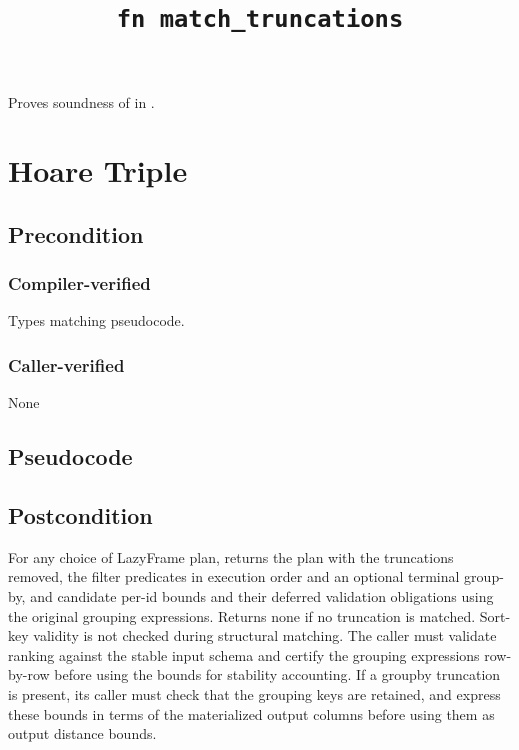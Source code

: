 \documentclass{article}
\title{\texttt{fn match\_truncations}}
\author{\MichaelShoemateAuthor}
\begin{document}
\maketitle


\contrib

Proves soundness of 
in .

\section{Hoare Triple}
\subsection*{Precondition}
\subsubsection*{Compiler-verified}
Types matching pseudocode.

\subsubsection*{Caller-verified}
None

\subsection*{Pseudocode}
\label{sec:python-pseudocode}


\subsection*{Postcondition}
\begin{theorem}[Postcondition]
    For any choice of LazyFrame plan,
    returns the plan with the truncations removed,
    the filter predicates in execution order and an optional terminal group-by,
    and candidate per-id bounds and their deferred validation obligations using the original grouping expressions.
    Returns none if no truncation is matched. Sort-key validity is not checked during structural matching.
    The caller must validate ranking against the stable input schema and certify the grouping expressions row-by-row
    before using the bounds for stability accounting.
    If a groupby truncation is present, its caller must check that the grouping keys are retained,
    and express these bounds in terms of the materialized output columns
    before using them as output distance bounds.
\end{theorem}
\end{document}
